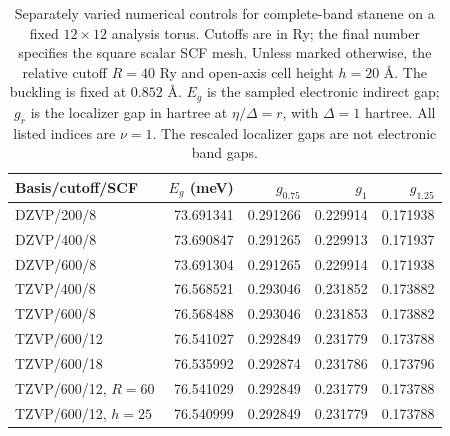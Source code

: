 \begin{table}[htbp]
\centering\small
\begin{tabular}{lrrrr}
\toprule
Basis/cutoff/SCF & $E_g$ (meV) & $g_{0.75}$ & $g_1$ & $g_{1.25}$\\
\midrule
DZVP/200/8 & 73.691341 & 0.291266 & 0.229914 & 0.171938\\
DZVP/400/8 & 73.690847 & 0.291265 & 0.229913 & 0.171937\\
DZVP/600/8 & 73.691304 & 0.291265 & 0.229914 & 0.171938\\
TZVP/400/8 & 76.568521 & 0.293046 & 0.231852 & 0.173882\\
TZVP/600/8 & 76.568488 & 0.293046 & 0.231853 & 0.173882\\
TZVP/600/12 & 76.541027 & 0.292849 & 0.231779 & 0.173788\\
TZVP/600/18 & 76.535992 & 0.292874 & 0.231786 & 0.173796\\
TZVP/600/12, $R=60$ & 76.541029 & 0.292849 & 0.231779 & 0.173788\\
TZVP/600/12, $h=25$ & 76.540999 & 0.292849 & 0.231779 & 0.173788\\
\bottomrule
\end{tabular}
\caption{Separately varied numerical controls for complete-band stanene
on a fixed $12\times12$ analysis torus. Cutoffs are in Ry; the final
number specifies the square scalar SCF mesh. Unless marked otherwise,
the relative cutoff $R=40$ Ry and open-axis cell height $h=20$ \AA.
The buckling is fixed at $0.852$ \AA. $E_g$ is the sampled electronic
indirect gap; $g_r$ is the localizer gap in hartree at
$\eta/\Delta=r$, with $\Delta=1$ hartree. All listed indices are
$\nu=1$. The rescaled localizer gaps are not electronic band gaps.}
\label{tab:si-stanene-separated}
\end{table}
